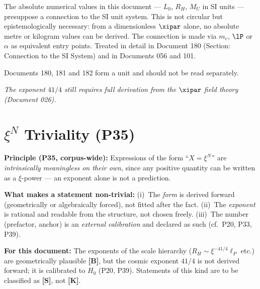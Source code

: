 \begin{foundation}
The absolute numerical values in this document — $L_0$, $R_H$, $M_U$ in SI units — presuppose a connection to the SI unit system. This is not circular but epistemologically necessary: from a dimensionless $\xipar$ alone, no absolute metre or kilogram values can be derived. The connection is made via $m_e$, $\lP$ or $\alpha$ as equivalent entry points. Treated in detail in Document 180 (Section: Connection to the SI System) and in Documents 056 and 101.

Documents 180, 181 and 182 form a unit and should not be read separately.
\end{foundation}

\vspace{1cm}
\noindent\textit{The exponent $41/4$ still requires full derivation from the $\xipar$ field theory (Document 026).}

\section*{$\xi^N$ Triviality (P35)}

\textbf{Principle (P35, corpus-wide):}
Expressions of the form ``$X = \xi^N$'' are \emph{intrinsically meaningless
on their own}, since any positive quantity can be written as a $\xi$-power
--- an exponent alone is not a prediction.

\textbf{What makes a statement non-trivial:}
(i)~The \emph{form} is derived forward (geometrically or algebraically
forced), not fitted after the fact.
(ii)~The \emph{exponent} is rational and readable from the structure,
not chosen freely.
(iii)~The number (prefactor, anchor) is an \emph{external calibration}
and declared as such (cf.\ P20, P33, P39).

\textbf{For this document:} The exponents of the scale hierarchy
($R_H \sim \xi^{-41/4} \ell_P$ etc.) are geometrically plausible \textbf{[B]},
but the cosmic exponent $41/4$ is not derived forward; it is calibrated to $H_0$ (P20, P39).
Statements of this kind are to be classified as \textbf{[S]}, not \textbf{[K]}.

